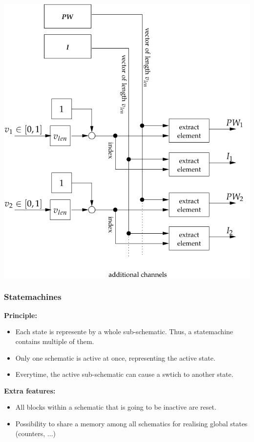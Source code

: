 \documentclass[serif,9pt,xcolor=dvipsnames]{beamer}
\begin{document}
\begin{frame}[fragile]
{     \begin{minipage}{0.55\linewidth}
\hspace{-1.8cm}
\vspace{2cm}
	\centering \includegraphics[width=1.0\linewidth]{figures/charge_control.pdf} 

     \end{minipage}    
  }

\end{frame}



\begin{frame}
  \frametitle{Statemachines}

  \textbf{Principle:}

  \begin{itemize}
   \item Each state is represente by a whole sub-schematic. Thus, a statemachine contains multiple of them.
   \item Only one schematic is active at once, representing the active state.
   \item Everytime, the active sub-schematic can cause a swtich to another state.
  \end{itemize}

  \textbf{Extra features:}
  \begin{itemize}
   \item All blocks within a schematic that is going to be inactive are reset.
   \item Possibility to share a memory among all schematics for realising global states (counters, ...)
  \end{itemize}

  
  

\end{frame}
\end{document}
